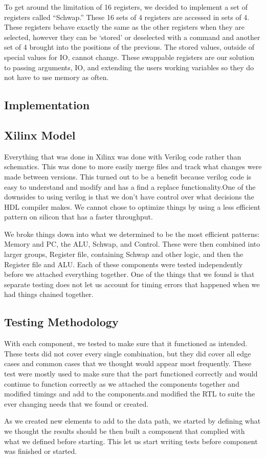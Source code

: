 \documentclass{report}
\begin{document}
			To get around the limitation of 16 registers, we decided to implement a set of registers called “Schwap.” These 16 sets of 4 registers are accessed in sets of 4. These registers behave exactly the same as the other registers when they are selected, however they can be ‘stored’ or deselected with a command and another set of 4 brought into the positions of the previous. The stored values, outside of special values for IO, cannot change. These swappable registers are our solution to passing arguments, IO, and extending the users working variables so they do not have to use memory as often.
		\subsection{Implementation}
		\subsection{Xilinx Model}
			Everything that was done in Xilinx was done with Verilog code rather than schematics. This was done to more easily merge files and track what changes were made between versions. This turned out to be a benefit because verilog code is easy to understand and modify and has a find a replace functionality.One of the downsides to using verilog is that we don’t have control over what decisions the HDL compiler makes. We cannot chose to optimize things by using a less efficient pattern on silicon that has a faster throughput.\par
			We broke things down into what we determined to be the most efficient patterns: Memory and PC, the ALU, Schwap, and Control. These were then combined into larger groups, Register file, containing Schwap and other logic, and then the Register file and ALU. Each of these components were tested independently before we attached everything together. One of the things that we found is that separate testing does not let us account for timing errors that happened when we had things chained together.
		\subsection{Testing Methodology}
			With each component, we tested to make sure that it functioned as intended. These tests did not cover every single combination, but they did cover all edge cases and common cases that we thought would appear most frequently. These test were mostly used to make sure that the part functioned correctly and would continue to function correctly as we attached the components together and modified timings and add to the components.and modified the RTL to suite the ever changing needs that we found or created.\par
			As we created new elements to add to the data path, we started by defining what we thought the results should be then built a component that complied with what we defined before starting. This let us start writing tests before component was finished or started.
\end{document}
